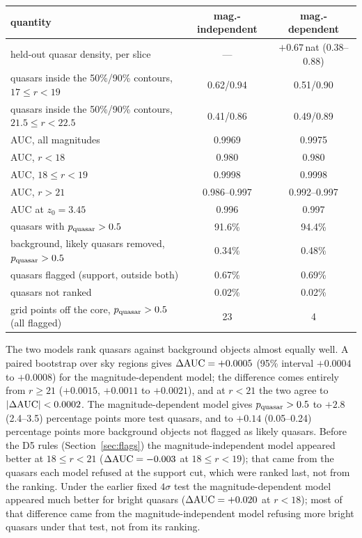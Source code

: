 \documentclass[11pt,a4paper]{article}
\begin{document}
\begin{center}\small
\begin{tabular}{lcc}
\toprule
quantity & mag.-independent & mag.-dependent \\
\midrule
held-out quasar density, per slice & --- & $+0.67$\,nat (0.38--0.88) \\
quasars inside the 50\%/90\% contours, $17\le r<19$ & 0.62/0.94 & 0.51/0.90 \\
quasars inside the 50\%/90\% contours, $21.5\le r<22.5$ & 0.41/0.86 & 0.49/0.89 \\
AUC, all magnitudes & 0.9969 & 0.9975 \\
AUC, $r<18$ & 0.980 & 0.980 \\
AUC, $18\le r<19$ & 0.9998 & 0.9998 \\
AUC, $r>21$ & 0.986--0.997 & 0.992--0.997 \\
AUC at $z_0=3.45$ & 0.996 & 0.997 \\
quasars with $p_{\rm quasar}>0.5$ & 91.6\% & 94.4\% \\
background, likely quasars removed, $p_{\rm quasar}>0.5$ & 0.34\% & 0.48\% \\
quasars flagged (support, outside both) & 0.67\% & 0.69\% \\
quasars not ranked & 0.02\% & 0.02\% \\
grid points off the core, $p_{\rm quasar}>0.5$ (all flagged) & 23 & 4 \\
\bottomrule
\end{tabular}
\end{center}

The two models rank quasars against background objects almost equally well. A paired bootstrap over sky
regions gives $\Delta{\rm AUC}=+0.0005$ (95\% interval $+0.0004$ to $+0.0008$) for the magnitude-dependent model;
the difference comes entirely from $r\ge21$ ($+0.0015$, $+0.0011$ to $+0.0021$), and at $r<21$ the two agree to
$|\Delta{\rm AUC}|<0.0002$. The magnitude-dependent model gives $p_{\rm quasar}>0.5$ to $+2.8$ (2.4--3.5) percentage
points more test quasars, and to $+0.14$ (0.05--0.24) percentage points more background objects not flagged as
likely quasars. Before the D5 rules (Section~\ref{sec:flags}) the magnitude-independent model appeared better at
$18\le r<21$ ($\Delta{\rm AUC}=-0.003$ at $18\le r<19$); that came from the quasars each model refused at the support
cut, which were ranked last, not from the ranking. Under the earlier fixed $4\sigma$ test the magnitude-dependent model appeared much
better for bright quasars ($\Delta{\rm AUC}=+0.020$ at $r<18$); most of that difference came from the
magnitude-independent model refusing more bright quasars under that test, not from its ranking.
\end{document}
